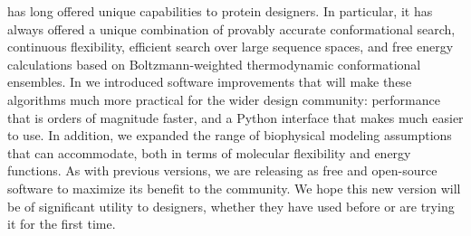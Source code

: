 \osprey has long offered unique capabilities to protein designers.  In particular, it has always offered a unique combination of provably accurate conformational search, continuous flexibility, efficient search over large sequence spaces, and free energy calculations based on Boltzmann-weighted thermodynamic conformational ensembles.  In  we introduced software improvements that will make these algorithms much more practical for the wider design community: performance that is orders of magnitude faster, and a Python interface that makes \osprey much easier to use.  In addition, we expanded the range of biophysical modeling assumptions that \osprey can accommodate, both in terms of molecular flexibility and energy functions.  As with previous versions, we are releasing  as free and open-source software to maximize its benefit to the community.  We hope this new version will be of significant utility to designers, whether they have used \osprey before or are trying it for the first time.  

